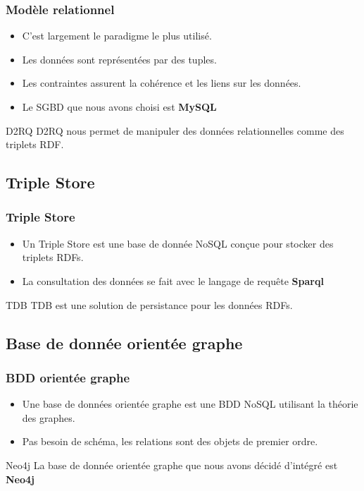 \documentclass[12pt]{beamer}
\begin{document}
\begin{frame}
\frametitle{Modèle relationnel}
\begin{itemize}
\item C'est largement le paradigme le plus utilisé.
\item Les données sont représentées par des tuples.
\item Les contraintes assurent la cohérence et les liens sur les données.
\item Le SGBD que nous avons choisi est \textbf{MySQL}
\end{itemize}
\begin{block}{D2RQ}
D2RQ nous permet de manipuler des données relationnelles comme des triplets RDF.
\end{block}




\end{frame}
\subsection{Triple Store}
\frametitle{Triple Store}
\begin{frame}
\begin{itemize}
\item Un Triple Store est une base de donnée NoSQL conçue pour stocker des triplets RDFs.
\item La consultation des données se fait avec le langage de requête \textbf{Sparql}
\end{itemize}

\begin{block}{TDB}
TDB est une solution de persistance pour les données RDFs.
\end{block}
\end{frame}
\subsection{Base de donnée orientée graphe}

\begin{frame}
\frametitle{BDD orientée graphe}
\begin{itemize}
\item Une base de données orientée graphe est une BDD NoSQL utilisant la théorie des graphes.
\item Pas besoin de schéma, les relations sont des objets de premier ordre.
\end{itemize}

\begin{block}{Neo4j}
La base de donnée orientée graphe que nous avons décidé d'intégré est \textbf{Neo4j}
\end{block}



\end{frame}
\end{document}
